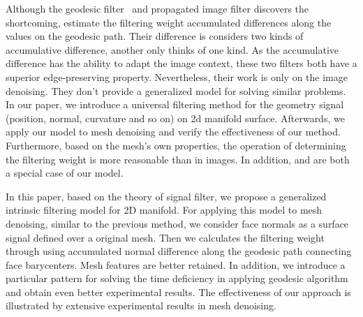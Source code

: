 Although the geodesic filter~\cite{grazzini2009edge} and propagated image filter \cite{Chang2015propagated} discovers the shortcoming, 
estimate the filtering weight accumulated differences along the values on the geodesic path.
Their difference is \cite{Chang2015propagated} considers two kinds of accumulative difference, another only thinks of one kind. 
As the accumulative difference has the ability to adapt the image context, these two filters both have a superior edge-preserving property.
Nevertheless, their work is only on the image denoising.
They don't provide a generalized model for solving similar problems.
In our paper, we introduce a universal filtering method for the geometry signal (position, normal, curvature and so on) on 2d manifold surface.
Afterwards, we apply our model to mesh denoising and verify the effectiveness of our method.
Furthermore, based on the mesh's own properties, the operation of determining the filtering weight is more reasonable than in images. 
In addition, \cite{grazzini2009edge} and \cite{Chang2015propagated} are both a special case of our model.


In this paper, based on the theory of signal filter, we propose a generalized intrinsic filtering model for 2D manifold. 
For applying this model to mesh denoising, 
similar to the previous method, we consider face normals as a surface signal defined over a original mesh.
Then we calculates the filtering weight through using accumulated normal difference along the geodesic path connecting face barycenters.
Mesh features are better retained. 
In addition, we introduce a particular pattern for solving the time deficiency in applying geodesic algorithm and obtain even better experimental results.
The effectiveness of our approach is illustrated by extensive experimental results in mesh denoising.

